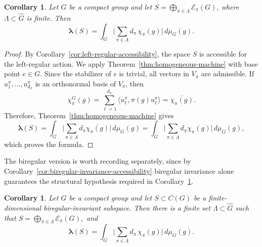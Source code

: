 \documentclass[11pt,showkeys]{amsart}
\newtheorem{corollary}[theorem]{Corollary}
\begin{document}
\begin{corollary}
\label{cor:left-regular-machine}
Let \(G\) be a compact group and let
\(S  =        \bigoplus_{\pi\in\Lambda}
        \mathcal E_\pi(G)
        \),
        where
        $\Lambda\subset\widehat G$ is finite.
        Then
\[
        \boldsymbol\lambda(S)
        =
        \int_G
        \Big|
        \sum_{\pi\in\Lambda}
        d_\pi\,\chi_\pi(g)
         \Big|
        \,d\mu_G(g).
\]
\end{corollary}



\begin{proof}
By Corollary~\ref{cor:left-regular-accessibility}, the space \(S\) is
accessible for the left-regular action. We apply
Theorem~\ref{thm:homogeneous-machine} with base point \(e\in G\). 
Since the stabilizer of \(e\) is trivial, all vectors in \(V_\pi\) are
admissible. If \(u_1^\pi,\ldots,u_{d_\pi}^\pi\) is an orthonormal basis
of \(V_\pi\), then
\[
        \chi_\pi^G(g)
        =
        \sum_{\ell=1}^{d_\pi}
        \langle u_\ell^\pi,\pi(g)u_\ell^\pi\rangle
        =
                \overline{\chi_\pi(g)}.
\]
Therefore, Theorem~\ref{thm:homogeneous-machine} gives
\[
\boldsymbol\lambda(S)
=
\int_G
\Big|
\sum_{\pi\in\Lambda}
d_\pi\overline{\chi_\pi(g)}
\Big|
\,d\mu_G(g)
=
\int_G
\Big|
\sum_{\pi\in\Lambda}
d_\pi\chi_\pi(g)
\Big|
\,d\mu_G(g),
\]
which proves the formula.
\end{proof}





The biregular version is worth recording separately, since by Corollary~\ref{cor:biregular-invariance-accessibility} biregular invariance alone guarantees the structural hypothesis required in
Corollary~\ref{cor:left-regular-machine}.

\begin{corollary}
\label{cor:biregular-machine}
Let \(G\) be a compact group and let \(S\subset C(G)\) be a
finite-dimensional biregular-invariant subspace. Then there is a finite set \(\Lambda\subset\widehat G\) such
that
\(
        S
        =
        \bigoplus_{\pi\in\Lambda}
        \mathcal E_\pi(G),
\)
and
\[
        \boldsymbol\lambda(S)
        =
        \int_G
         \Big|
        \sum_{\pi\in\Lambda}
        d_\pi\,\chi_\pi(g)
        \Big|
        \,d\mu_G(g).
\]
\end{corollary}
\end{document}
